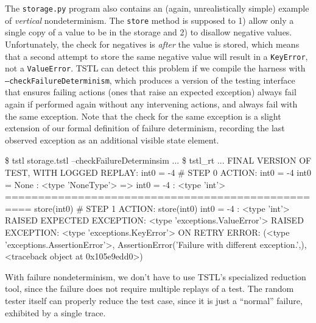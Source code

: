 The {\tt storage.py} program also contains an (again, unrealistically
simple) example of \emph{vertical} nondeterminism.  The {\tt store}
method is supposed to 1) allow only a single copy of a value to be in
the storage and 2) to disallow negative values.  Unfortunately, the
check for negatives is \emph{after} the value is stored, which means
that a second attempt to store the same negative value will result in
a {\tt KeyError}, not a {\tt ValueError}.  TSTL can detect this
problem if we compile the harness with {\tt
  --checkFailureDeterminism}, which produces a version of the testing
interface that ensures failing actions (ones that raise an expected
exception) always fail again if performed again without any
intervening actions, and always fail with the same exception.  Note
that the check for the same exception is a slight extension of our formal
definition of failure determinism, recording the last observed
exception as an additional visible state element.

{\scriptsize
\begin{code}
 \$ tstl storage.tstl --checkFailureDeterminsim
 ...
 \$ tstl\_rt
 ...
 FINAL VERSION OF TEST, WITH LOGGED REPLAY:
 int0 = -4                                   \# STEP 0
 ACTION: int0 = -4 
 int0 = None : <type 'NoneType'>
 => int0 = -4 : <type 'int'>
 ==================================================
 store(int0)                                 \# STEP 1
 ACTION: store(int0) 
 int0 = -4 : <type 'int'>
 RAISED EXPECTED EXCEPTION:
   <type 'exceptions.ValueError'> 
 RAISED EXCEPTION:
   <type 'exceptions.KeyError'>  ON RETRY
   ERROR: (<type 'exceptions.AssertionError'>,
   AssertionError('Failure with different exception.',),
 <traceback object at 0x105e9edd0>)
\end{code}
}

With failure nondeterminism, we don't have to use TSTL's specialized reduction
tool, since the failure does not require multiple replays of a test.
The random tester itself can properly reduce the test case, since it
is just a ``normal'' failure, exhibited by a single trace.